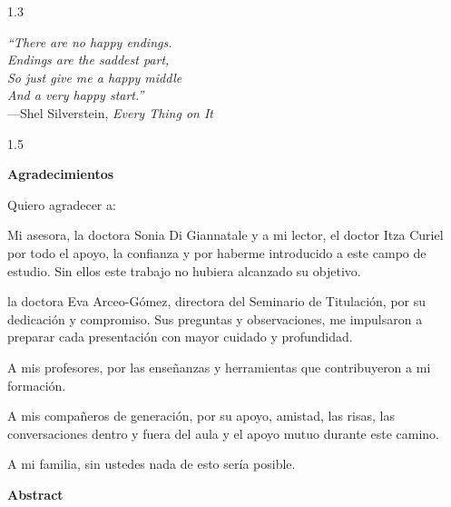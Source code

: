 \documentclass[12pt]{article}
\theoremstyle{definition}
\theoremstyle{plain}
\begin{document}
\newpage
\begin{spacing}{1.3}
\vspace*{\fill}
\begin{center}
\textit{``There are no happy endings.\\
Endings are the saddest part,\\
So just give me a happy middle\\
And a very happy start.''}\\[0.8cm]
{\small ---Shel Silverstein, \textit{Every Thing on It}}
\end{center}
\vspace*{\fill}
\end{spacing}
\newpage
\begin{spacing}{1.5}

{\bf {\large Agradecimientos}}
\vspace{2cm}

Quiero agradecer a:

Mi asesora, la doctora Sonia Di Giannatale y a mi lector, el doctor Itza Curiel por todo el apoyo, la confianza y por haberme introducido a este campo de estudio. Sin ellos este trabajo no hubiera alcanzado su objetivo.

la doctora Eva Arceo-Gómez, directora del Seminario de Titulación, por su dedicación y compromiso. Sus preguntas y observaciones, me impulsaron a preparar cada presentación con mayor cuidado y profundidad.

A mis profesores, por las enseñanzas y herramientas que contribuyeron a mi formación.

A mis compañeros de generación, por su apoyo, amistad, las risas, las conversaciones dentro y fuera del aula y el apoyo mutuo durante este camino.

A mi familia, sin ustedes nada de esto sería posible.

\newpage
\begin{center}
{\bf {\large  Abstract}}
\end{center}

\vspace{2 cm}


\end{spacing}
\end{document}
